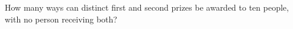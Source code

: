 How many ways can distinct first and second prizes be awarded to ten people, with no person receiving both?
